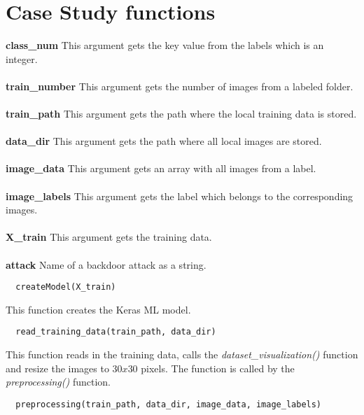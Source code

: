 \section{Case Study functions}
\label{sec:case_study_functions}

\textbf{class\_num}
This argument gets the key value from the labels which is an integer. \\ \\
\textbf{train\_number}
This argument gets the number of images from a labeled folder. \\ \\
\textbf{train\_path}
This argument gets the path where the local training data is stored. \\ \\
\textbf{data\_dir}
This argument gets the path where all local images are stored. \\ \\
\textbf{image\_data}
This argument gets an array with all images from a label. \\ \\
\textbf{image\_labels}
This argument gets the label which belongs to the corresponding images. \\ \\
\textbf{X\_train}
This argument gets the training data. \\ \\
\textbf{attack}
Name of a backdoor attack as a string. \\

\begin{lstlisting}
  createModel(X_train)
\end{lstlisting}

\noindent This function creates the Keras ML model.

\begin{lstlisting}
  read_training_data(train_path, data_dir)
\end{lstlisting}

\noindent This function reads in the training data, calls the \textit{dataset\_visualization()} function and resize the images to $30x30$ pixels. The function is called by the \textit{preprocessing()} function.

\begin{lstlisting}
  preprocessing(train_path, data_dir, image_data, image_labels)
\end{lstlisting}


